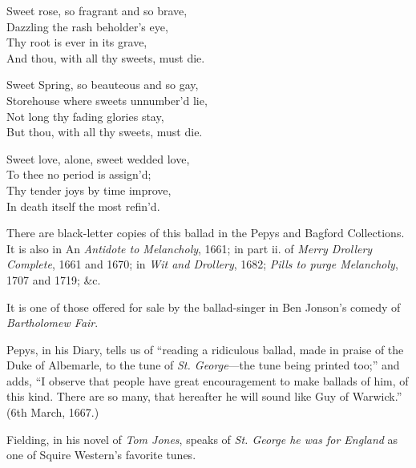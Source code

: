 \settowidth{\versewidth}{Storehouse where sweets unnumher’d lie,}
\begin{dcverse}\begin{altverse}
Sweet rose, so fragrant and so brave,\\
Dazzling the rash beholder’s eye,\\
Thy root is ever in its grave,\\
And thou, with all thy sweets, must die.
\end{altverse}

\begin{altverse}
Sweet Spring, so beauteous and so gay,\\
Storehouse where sweets unnumber’d lie,\\
Not long thy fading glories stay,\\
But thou, with all thy sweets, must die.
\end{altverse}

\begin{altverse}
Sweet love, alone, sweet wedded love,\\
To thee no period is assign’d;\\
Thy tender joys by time improve,\\
In death itself the most refin’d.
\end{altverse}
\end{dcverse}
\pagebreak


There are black-letter copies of this ballad in the Pepys and Bagford Collections. 
It is also in An \textit{Antidote to Melancholy}, 1661; in part ii. of \textit{Merry
Drollery Complete}, 1661 and 1670; in \textit{Wit and Drollery}, 1682; \textit{Pills to purge
Melancholy}, 1707 and 1719; \&c.

It is one of those offered for sale by the ballad-singer in Ben Jonson’s
comedy of \textit{Bartholomew Fair}.

Pepys, in his Diary, tells us of “reading a ridiculous ballad, made in praise of
the Duke of Albemarle, to the tune of \textit{St. George}—the tune being printed too;”
and adds, “I observe that people have great encouragement to make ballads of
him, of this kind. There are so many, that hereafter he will sound like Guy of
Warwick.” (6th March, 1667.)

Fielding, in his novel of \textit{Tom Jones}, speaks of \textit{St. George he was for England}
as one of Squire Western’s favorite tunes.

